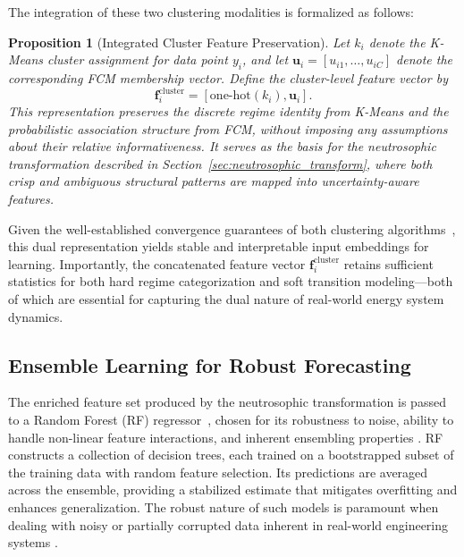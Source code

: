 \documentclass[review,3p,times]{elsarticle}
\newtheorem{proposition}[definition]{Proposition}
\begin{document}
The integration of these two clustering modalities is formalized as follows:

\begin{proposition}[Integrated Cluster Feature Preservation]
\label{prop:feature_integration}
Let $k_i$ denote the K-Means cluster assignment for data point $y_i$, and let $\mathbf{u}_i = [u_{i1}, \ldots, u_{iC}]$ denote the corresponding FCM membership vector. Define the cluster-level feature vector by
\begin{equation}
\mathbf{f}_i^{\mathrm{cluster}} = [\mathrm{one\text{-}hot}(k_i), \mathbf{u}_i].
\end{equation}
This representation preserves the discrete regime identity from K-Means and the probabilistic association structure from FCM, without imposing any assumptions about their relative informativeness. It serves as the basis for the neutrosophic transformation described in Section~\ref{sec:neutrosophic_transform}, where both crisp and ambiguous structural patterns are mapped into uncertainty-aware features.
\end{proposition}

Given the well-established convergence guarantees of both clustering algorithms~\cite{bezdek1984fcm, macqueen1967some}, this dual representation yields stable and interpretable input embeddings for learning. Importantly, the concatenated feature vector $\mathbf{f}_i^{\mathrm{cluster}}$ retains sufficient statistics for both hard regime categorization and soft transition modeling—both of which are essential for capturing the dual nature of real-world energy system dynamics.

\subsection{Ensemble Learning for Robust Forecasting}

The enriched feature set produced by the neutrosophic transformation is passed to a Random Forest (RF) regressor~\cite{breiman2001random}, chosen for its robustness to noise, ability to handle non-linear feature interactions, and inherent ensembling properties \cite{yu2025cognitive}. RF constructs a collection of decision trees, each trained on a bootstrapped subset of the training data with random feature selection. Its predictions are averaged across the ensemble, providing a stabilized estimate that mitigates overfitting and enhances generalization. The robust nature of such models is paramount when dealing with noisy or partially corrupted data inherent in real-world engineering systems \cite{zhang2025robust}.
\end{document}
